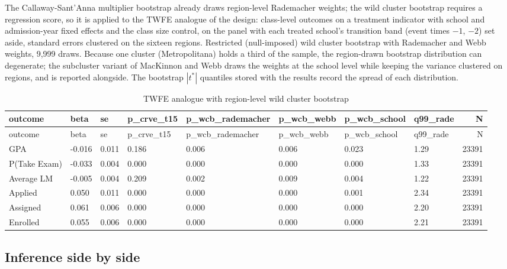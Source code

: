 \documentclass[
]{article}
\begin{document}
The Callaway-Sant'Anna multiplier bootstrap already draws region-level
Rademacher weights; the wild cluster bootstrap requires a regression
score, so it is applied to the TWFE analogue of the design: class-level
outcomes on a treatment indicator with school and admission-year fixed
effects and the class size control, on the panel with each treated
school's transition band (event times \(-1\), \(-2\)) set aside,
standard errors clustered on the sixteen regions. Restricted
(null-imposed) wild cluster bootstrap with Rademacher and Webb weights,
9,999 draws. Because one cluster (Metropolitana) holds a third of the
sample, the region-drawn bootstrap distribution can degenerate; the
subcluster variant of MacKinnon and Webb draws the weights at the school
level while keeping the variance clustered on regions, and is reported
alongside. The bootstrap \(|t^*|\) quantiles stored with the results
record the spread of each distribution.

\begin{longtable}[]{@{}llllllllr@{}}
\caption{TWFE analogue with region-level wild cluster
bootstrap}\tabularnewline
\toprule
outcome & beta & se & p\_crve\_t15 & p\_wcb\_rademacher & p\_wcb\_webb &
p\_wcb\_school & q99\_rade & N \\
\midrule
\endfirsthead
\toprule
outcome & beta & se & p\_crve\_t15 & p\_wcb\_rademacher & p\_wcb\_webb &
p\_wcb\_school & q99\_rade & N \\
\midrule
\endhead
GPA & -0.016 & 0.011 & 0.186 & 0.006 & 0.006 & 0.023 & 1.29 & 23391 \\
P(Take Exam) & -0.033 & 0.004 & 0.000 & 0.000 & 0.000 & 0.000 & 1.33 &
23391 \\
Average LM & -0.005 & 0.004 & 0.209 & 0.002 & 0.009 & 0.004 & 1.22 &
23391 \\
Applied & 0.050 & 0.011 & 0.000 & 0.000 & 0.000 & 0.001 & 2.34 &
23391 \\
Assigned & 0.061 & 0.006 & 0.000 & 0.000 & 0.000 & 0.000 & 2.20 &
23391 \\
Enrolled & 0.055 & 0.006 & 0.000 & 0.000 & 0.000 & 0.000 & 2.21 &
23391 \\
\bottomrule
\end{longtable}

\hypertarget{inference-side-by-side}{%
\subsection{Inference side by side}\label{inference-side-by-side}}
\end{document}
